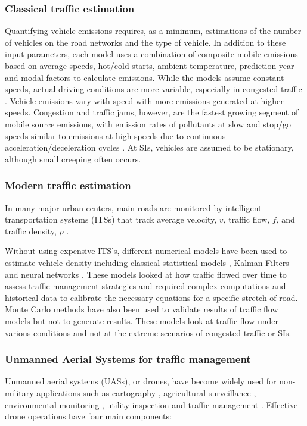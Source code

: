 \subsubsection{Classical traffic estimation} \label{sssec:ClassicalTraffic}

Quantifying vehicle emissions requires, as a minimum, estimations of the number of vehicles on the road networks and the type of vehicle. In addition to these input parameters, each model uses a combination of composite mobile emissions based on average speeds, hot/cold starts, ambient temperature, prediction year and modal factors to calculate emissions\citep{Franco2013}. While the models assume constant speeds, actual driving conditions are more variable, especially in congested traffic \citep{Freeman2015b}. Vehicle emissions vary with speed with more emissions generated at higher speeds. Congestion and traffic jams, however, are the fastest growing segment of mobile source emissions, with emission rates of pollutants at slow and stop/go speeds similar to emissions at high speeds due to continuous acceleration/deceleration cycles \citep{Barth2009}. At SIs, vehicles are assumed to be stationary, although small creeping often occurs.

\subsubsection{Modern traffic estimation}

In many major urban centers, main roads are monitored by intelligent transportation systems (ITSs) that track average velocity, $v$, traffic flow, $f$, and traffic density, $\rho$ \citep{Wu2007, Abtahi2011, Bartosz2015}.

Without using expensive ITS's, different numerical models have been used to estimate vehicle density including classical statistical models \citep{Schreckenberg1995}, Kalman Filters \citep{Pourmoallem1997, Sun2004} and neural networks \citep{Ghosh-Dastidar2006}.  These models looked at how traffic flowed over time to assess traffic management strategies and required complex computations and historical data to calibrate the necessary equations for a specific stretch of road.  Monte Carlo methods have also been used to validate results of traffic flow models \citep{Mihaylova2004} but not to generate results.  These models look at traffic flow under various conditions and not at the extreme scenarios of congested traffic or SIs. 

\subsubsection{Unmanned Aerial Systems for traffic management} 
Unmanned aerial systems (UASs), or drones, have become widely used for non-military applications such as cartography \citep{Saadatseresht2015}, agricultural surveillance \citep{Saari2017}, environmental monitoring \citep{Capolupo2015, Rees2018}, utility inspection \citep{Day2017, Gomez2017} and traffic management \citep{Ahmadi2017,  Salvo2017, Liu2013}.  Effective drone operations have four main components:

